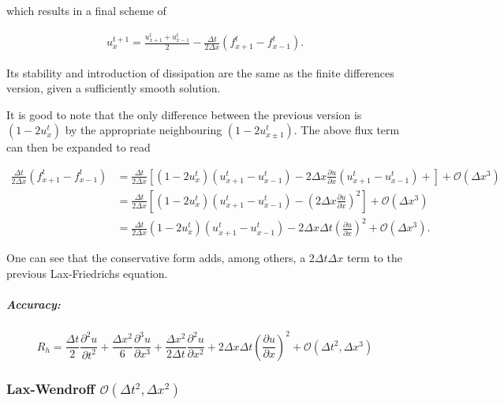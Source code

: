 \documentclass[11pt]{article}
\begin{document}
which results in a final scheme of

\begin{align}
    u_x^{t+1} = \frac{u_{x+1}^t + u_{x-1}^t}{2} -\frac{\Delta t}{2\Delta x}\left(f_{x+1}^{t} - f_{x-1}^{t}\right).
\end{align}

Its stability and introduction of dissipation are the same as the finite
differences version, given a sufficiently smooth solution.

It is good to note that the only difference between the previous version
is \((1-2u_x^t)\) by the appropriate neighbouring
\(( 1-2u_{x \pm 1}^t)\). The above flux term can then be expanded to
read

\begin{align}
    \frac{\Delta t}{2\Delta x}\left(f_{x+1}^{t} - f_{x-1}^{t}\right) &= \frac{\Delta t}{2\Delta x}\left[(1-2u_x^t)(u_{x+1}^t - u_{x-1}^t) - 2\Delta x\frac{\partial u}{\partial x}(u_{x+1}^t - u_{x-1}^t) + \right] + \mathcal{O}(\Delta x^3) \\
    &= \frac{\Delta t}{2\Delta x}\left[(1-2u_x^t)(u_{x+1}^t - u_{x-1}^t) - \left(2\Delta x \frac{\partial u}{\partial x}\right)^2   \right] + \mathcal{O}(\Delta x^3) \\
    &= \frac{\Delta t}{2\Delta x}(1-2u_x^t)(u_{x+1}^t - u_{x-1}^t) - 2\Delta x\Delta t\left(\frac{\partial u}{\partial x}\right)^2 + \mathcal{O}(\Delta x^3).
\end{align}

One can see that the conservative form adds, among others, a
\(2\Delta t\Delta x\) term to the previous Lax-Friedrichs equation.

\subparagraph{Accuracy:}\label{accuracy}

\begin{equation}
R_h = \frac{\Delta t}{2}\frac{\partial^2 u}{\partial t^2} + \frac{\Delta x^2}{6}\frac{\partial^3 u}{\partial x^3} + \frac{\Delta x^2}{2\Delta t}\frac{\partial^2 u}{\partial x^2} + 2\Delta x\Delta t\left(\frac{\partial u}{\partial x}\right)^2 + \mathcal{O}(\Delta t^2, \Delta x^3)
\end{equation}

    \subsubsection{\texorpdfstring{Lax-Wendroff
\(\mathcal{O}(\Delta t^2, \Delta x^2)\)}{Lax-Wendroff \textbackslash{}mathcal\{O\}(\textbackslash{}Delta t\^{}2, \textbackslash{}Delta x\^{}2)}}\label{lax-wendroff-mathcalodelta-t2-delta-x2}
\end{document}
